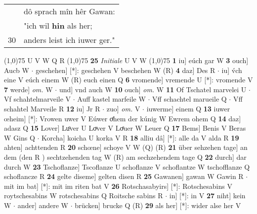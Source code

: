 \documentclass[8pt,a4paper,notitlepage]{article}
\begin{document}
\begin{table}[ht]
\begin{minipage}[t]{0.5\linewidth}
\begin{tabular}{rl}
 & dô sprach mîn hêr Gawan:\\ 
 & "ich wil \textbf{hin} als her;\\ 
30 & anders leist ich iuwer ger."\\ 
\end{tabular}
\scriptsize
\line(1,0){75} \newline
U V W Q R \newline
\line(1,0){75} \newline
\textbf{25} \textit{Initiale} U V W  \newline
\line(1,0){75} \newline
\textbf{1} iu] eúch gar W \textbf{3} ouch] Aucb W  $\cdot$ geschehen] [*]: geschehen V beschehen W (R) \textbf{4} daz] Des R  $\cdot$ iu] v́ch eine V eúch einem W (R) euch einen Q \textbf{6} vromende] vremende U [*]: vromende V \textbf{7} werde] \textit{om.} W  $\cdot$ und] vnd auch W \textbf{10} ouch] \textit{om.} W \textbf{11} Of Tschatel marvelei U  $\cdot$ Vf schahtelmarveile V  $\cdot$ Auff kastel marfeile W  $\cdot$ Vff schachtel marueile Q  $\cdot$ Vff schahtel Marveile R \textbf{12} iu] Jr R  $\cdot$ zuo] \textit{om.} V  $\cdot$ iuwerme] einem Q \textbf{13} iuwer œheim] [*]: Vrowen uwer V Eúwer oͤhem der kúnig W Ewrem ohem Q \textbf{14} daz] adasz Q \textbf{15} Lover] Luͦver U Loͮver V Loͤuer W Leuer Q \textbf{17} Bems] Benis V Beras W Gins Q  $\cdot$ Korcha] koicha U korka V R \textbf{18} alliu dâ] [*]: alle da V alda R \textbf{19} ahten] achttenden R \textbf{20} schœne] schoye V W (Q) (R) \textbf{21} über sehzehen tage] an dem (den R ) sechtzehenden tag W (R) am sechzehendem tage Q \textbf{22} durch] dar durch W \textbf{23} Tschoflanze] Tscoflanze U schoflanze V schoflantze W tschofflanze Q schoflancze R \textbf{24} gelte diseme] gelten disen R \textbf{25} Gawanen] gawan W Gawin R  $\cdot$ mit im bat] [*]: mit im riten bat V \textbf{26} Rotschasabyirs] [*]: Rotschesabins V roytschesabins W rotschesabins Q Roitsche sabins R  $\cdot$ in] [*]: in V \textbf{27} niht] kein W  $\cdot$ ander] andere W  $\cdot$ brücken] brucke Q (R) \textbf{29} als her] [*]: wider alse her V \newline
\end{minipage}
\end{table}
\end{document}
